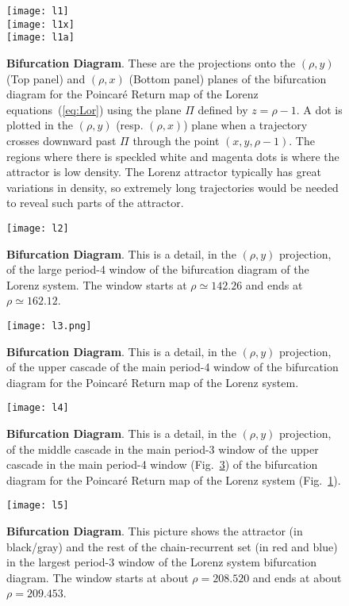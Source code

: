 \newpage
\begin{figure}
 \centering
 \texttt{[image: l1]}\\
 \texttt{[image: l1x]}\\
 \texttt{[image: l1a]}\\
 \caption{{\bf Bifurcation Diagram}. These are the projections onto the $(\rho,y)$ (Top panel) and $(\rho,x)$ (Bottom panel) planes of the bifurcation diagram for the Poincar\'e Return map of the Lorenz equations~(\ref{eq:Lor}) using the plane $\Pi$ defined by $z=\rho-1$. A dot is plotted in the $(\rho,y)$ (resp. $(\rho,x)$) plane when a trajectory crosses downward past $\Pi$ through the point $(x,y,\rho-1)$. The regions where there is speckled white and magenta dots is where the attractor is low density. The Lorenz attractor typically has great variations in density, so extremely long trajectories would be needed to reveal such parts of the attractor.
 }
 \label{fig:l1}
\end{figure} 
\begin{figure}
 \centering
 \texttt{[image: l2]}
 \caption{{\bf Bifurcation Diagram}. This is a detail, in the $(\rho,y)$ projection, of the large period-4 window of the bifurcation diagram of the Lorenz system. The window starts at $\rho\simeq142.26$ and ends at $\rho\simeq162.12$.}
 \label{fig:l2}
\end{figure} 
\begin{figure}
 \centering
 \texttt{[image: l3.png]}
 \caption{{\bf Bifurcation Diagram}. This is a detail, in the $(\rho,y)$ projection, of the upper cascade of the main period-4 window of the bifurcation diagram for the Poincar\'e Return map of the Lorenz system.}
 \label{fig:l3}
\end{figure} 
\begin{figure}
 \centering
 \texttt{[image: l4]}
 \caption{{\bf Bifurcation Diagram}. This is a detail, in the $(\rho,y)$ projection, of the middle cascade in the main period-3 window of the upper cascade in the main period-4 window (Fig.~\ref{fig:l3}) of the bifurcation diagram for the Poincar\'e Return map of the Lorenz system (Fig.~\ref{fig:l1}).}
 \label{fig:l4}
\end{figure} 
\begin{figure}
 \centering
 \texttt{[image: l5]}
 \caption{{\bf Bifurcation Diagram}. This picture shows the attractor (in black/gray) and the rest of the chain-recurrent set (in red and blue) in the largest period-3 window of the Lorenz system bifurcation diagram. The window starts at about $\rho=208.520$ and ends at about $\rho=209.453$.}
 \label{fig:l5}
\end{figure} 
